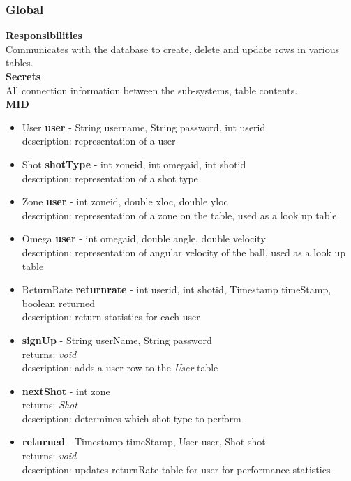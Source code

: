\documentclass[11pt]{article}
\begin{document}
\subsubsection*{Global}
\textbf{Responsibilities} \\
Communicates with the database to create, delete and update rows in various tables.  \\
\textbf{Secrets} \\ 
All connection information between the sub-systems, table contents.\\ 
\textbf{MID} \\
\begin{itemize}
\item User \textbf{user} - String user\textunderscore name, String password, int user\textunderscore id \\ description: representation of a user 
\item Shot \textbf{shotType} - int zone\textunderscore id, int omega\textunderscore id, int shot\textunderscore id \\ description: representation of a shot type
\item Zone \textbf{user} -  int zone\textunderscore id, double x\textunderscore loc, double y\textunderscore loc \\ description: representation of a zone on the table, used as a look up table 
\item Omega \textbf{user} - int omega\textunderscore id, double angle, double velocity \\ description: representation of angular velocity of the ball, used as a look up table 
\item ReturnRate \textbf{return\textunderscore rate} - int user\textunderscore id, int shot\textunderscore id,  Timestamp timeStamp, boolean returned \\ description: return statistics for each user
\item \textbf{signUp} - String userName, String password \\ returns: \textit{void} \\ description: adds a user row to the \textit{User} table
\item \textbf{nextShot} - int zone \\ returns: \textit{Shot} \\ description: determines which shot type to perform
\item \textbf{returned} - Timestamp timeStamp, User user, Shot shot \\ returns: \textit{void} \\ description: updates returnRate table for user for performance statistics
\end{itemize}
\end{document}
